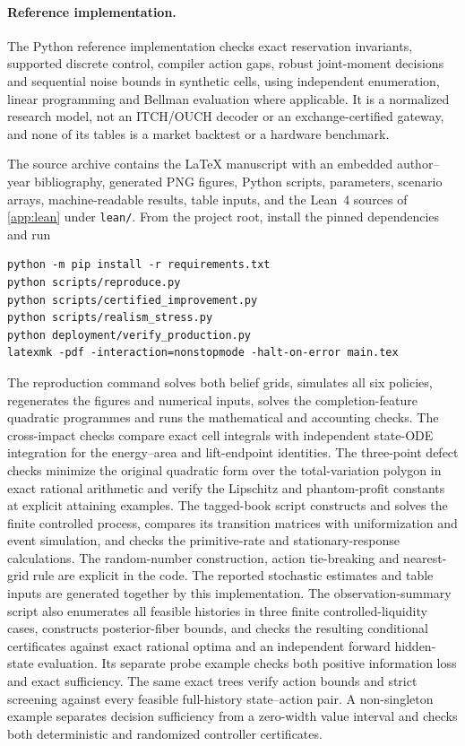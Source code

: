 \documentclass[11pt]{article}
\numberwithin{equation}{section}
\theoremstyle{definition}
\theoremstyle{remark}
\theoremstyle{definition}
\begin{document}
\paragraph{Reference implementation.}
The Python reference implementation checks exact reservation invariants,
supported discrete control, compiler action gaps, robust joint-moment decisions
and sequential noise bounds in synthetic cells, using independent enumeration,
linear programming and Bellman evaluation where applicable. It is a normalized
research model, not an ITCH/OUCH decoder or an exchange-certified gateway, and
none of its tables is a market backtest or a hardware benchmark.

The source archive contains the LaTeX manuscript with an embedded
author--year bibliography, generated PNG figures, Python scripts,
parameters, scenario arrays, machine-readable results, table inputs, and the
Lean~4 sources of \cref{app:lean} under \texttt{lean/}.
From the project root, install the pinned dependencies and run
\begin{verbatim}
python -m pip install -r requirements.txt
python scripts/reproduce.py
python scripts/certified_improvement.py
python scripts/realism_stress.py
python deployment/verify_production.py
latexmk -pdf -interaction=nonstopmode -halt-on-error main.tex
\end{verbatim}
The reproduction command solves both belief grids, simulates all six policies,
regenerates the figures and numerical inputs, solves the completion-feature
quadratic programmes and runs the mathematical and accounting checks.
The cross-impact checks compare exact cell integrals with independent
state-ODE integration for the energy--area and lift-endpoint identities.
The three-point defect checks minimize the original quadratic form over the
total-variation polygon in exact rational arithmetic and verify the
Lipschitz and phantom-profit constants at explicit attaining examples.
The tagged-book script constructs and solves the finite controlled process,
compares its transition matrices with uniformization and event simulation,
and checks the primitive-rate and stationary-response calculations.
The random-number construction, action tie-breaking and nearest-grid rule are
explicit in the code. The reported stochastic estimates and table inputs
are generated together by this implementation.
The observation-summary script also enumerates all feasible histories in
three finite controlled-liquidity cases, constructs posterior-fiber bounds,
and checks the resulting conditional certificates against exact rational
optima and an independent forward hidden-state evaluation. Its separate
probe example checks both positive information loss and exact sufficiency.
The same exact trees verify action bounds and strict screening against
every feasible full-history state--action pair. A non-singleton example
separates decision sufficiency from a zero-width value interval and checks
both deterministic and randomized controller certificates.
\end{document}

